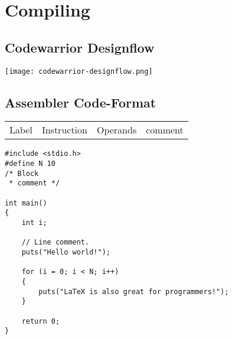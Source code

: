 \section{Compiling}

\subsection{Codewarrior Designflow}

\texttt{[image: codewarrior-designflow.png]}

\subsection{Assembler Code-Format}

\begin{tabular}{llll}
    Label & Instruction & Operands & comment \\
\end{tabular}

\begin{lstlisting}
#include <stdio.h>
#define N 10
/* Block
 * comment */

int main()
{
    int i;

    // Line comment.
    puts("Hello world!");

    for (i = 0; i < N; i++)
    {
        puts("LaTeX is also great for programmers!");
    }

    return 0;
}
\end{lstlisting}

